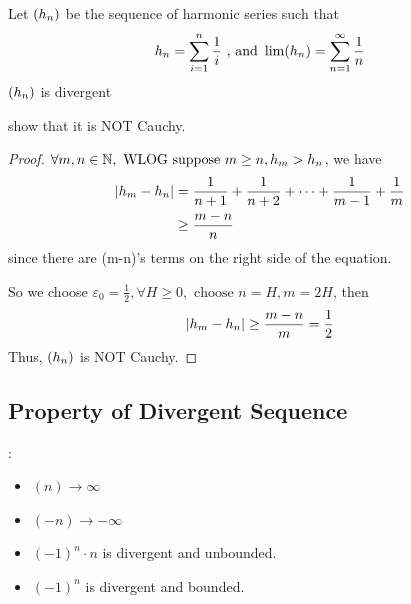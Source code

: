 \documentclass[a4paper,12pt]{article}
\begin{document}
\newpage
\begin{example}
    Let \((h_{n})\) be the sequence of harmonic series such that 
    \[h_n=\sum_{i=1}^{n}\frac{1}{i}\text{ , and } \lim(h_{n})=\sum_{n=1}^{\infty}\frac{1}{n}\]
     \((h_{n})\) is divergent 

     show that it is NOT Cauchy.
    \begin{proof}
        \(\forall m,n\in\mathbb{N}, \text{ WLOG suppose }m\ge n, h_m>h_n\), we have 
        \begin{align*}
            \left\lvert h_m-h_n\right\rvert&=\frac{1}{n+1}+\frac{1}{n+2}+\dots+\frac{1}{m-1}+\frac{1}{m}\\
            &\ge \frac{m-n}{n}
        \end{align*}
        since there are (m-n)'s terms on the right side of the equation. 

        So we choose \(\varepsilon_0=\frac{1}{2},\forall H\ge 0, \text{ choose }n=H,m=2H\), then
        \[\left\lvert h_m-h_n\right\rvert\ge \frac{m-n}{m}=\frac{1}{2}\]
        Thus, \((h_{n})\) is NOT Cauchy.
    \end{proof}
\end{example}
\newpage

\subsection{Property of Divergent Sequence}
\begin{example}:
    \begin{itemize}
        \item \((n)\rightarrow\infty\)
        \item \((-n)\rightarrow -\infty\)
        \item \((-1)^n\cdot n\) is divergent and unbounded.
        \item \((-1)^n\) is divergent and bounded.\\
    \end{itemize}
\end{example}
\end{document}
